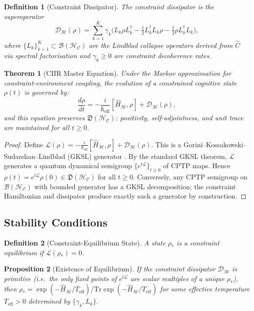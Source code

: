 \documentclass[twocolumn,aps,prd,superscriptaddress,nofootinbib]{revtex4-2}
\newtheorem{theorem}{Theorem}[section]
\newtheorem{proposition}[theorem]{Proposition}
\newtheorem{definition}{Definition}[section]
\newcommand{\HC}{\mathcal{H}_{\mathcal{C}}}
\newcommand{\CM}{\mathcal{M}}
\newcommand{\CD}{\mathcal{D}}
\newcommand{\CB}{\mathcal{B}}
\newcommand{\hatC}{\hat{C}}
\newcommand{\hatH}{\hat{H}}
\newcommand{\Tr}{\mathrm{Tr}}
\begin{document}
\begin{definition}[Constraint Dissipator]
\label{def:dissipator}
The \emph{constraint dissipator} is the superoperator
\[
  \CD_\CM(\rho) = \sum_{k=1}^{K} \gamma_k \bigl(
    L_k \rho L_k^\dagger -
    \tfrac{1}{2} L_k^\dagger L_k \rho -
    \tfrac{1}{2} \rho L_k^\dagger L_k
  \bigr),
\]
where $\{L_k\}_{k=1}^K \subset \CB(\HC)$ are the \emph{Lindblad collapse
operators} derived from $\hatC$ via spectral factorisation and
$\gamma_k \geq 0$ are constraint decoherence rates.
\end{definition}

\begin{theorem}[CIIR Master Equation]
\label{thm:master}
Under the Markov approximation for constraint-environment coupling, the
evolution of a constrained cognitive state $\rho(t)$ is governed by:
\begin{equation}
  \frac{d\rho}{dt} = -\frac{i}{\hbar_{\mathrm{eff}}}[\hatH_\CM, \rho]
    + \CD_\CM(\rho),
  \label{eq:master}
\end{equation}
and this equation preserves $\mathfrak{D}(\HC)$: positivity, self-adjointness,
and unit trace are maintained for all $t \geq 0$.
\end{theorem}

\begin{proof}
Define $\mathcal{L}(\rho) = -\frac{i}{\hbar_{\mathrm{eff}}}[\hatH_\CM,\rho] + \CD_\CM(\rho)$.
This is a Gorini--Kossakowski--Sudarshan--Lindblad (GKSL) generator
\cite{Lindblad1976, GKS1976}.  By the standard GKSL theorem, $\mathcal{L}$
generates a quantum dynamical semigroup $\{e^{t\mathcal{L}}\}_{t\geq 0}$ of
CPTP maps.  Hence $\rho(t) = e^{t\mathcal{L}}\rho(0) \in \mathfrak{D}(\HC)$
for all $t \geq 0$.  Conversely, any CPTP semigroup on $\CB(\HC)$ with bounded
generator has a GKSL decomposition; the constraint Hamiltonian and dissipator
produce exactly such a generator by construction.
\end{proof}

\subsection{Stability Conditions}

\begin{definition}[Constraint-Equilibrium State]
A state $\rho_*$ is a \emph{constraint equilibrium} if $\mathcal{L}(\rho_*)=0$.
\end{definition}

\begin{proposition}[Existence of Equilibrium]
\label{prop:equilibrium}
If the constraint dissipator $\CD_\CM$ is \emph{primitive} (i.e.\ the only
fixed points of $e^{t\mathcal{L}}$ are scalar multiples of a unique
$\rho_*$), then $\rho_* = \exp(-\hatH_\CM/T_\mathrm{eff}) /
\Tr\exp(-\hatH_\CM/T_\mathrm{eff})$ for some effective temperature
$T_\mathrm{eff} > 0$ determined by $\{\gamma_k, L_k\}$.
\end{proposition}
\end{document}
